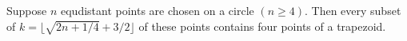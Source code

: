 Suppose $n$ equdistant points are chosen on a circle $(n \geq 4)$. Then every subset of $k = \lfloor \sqrt{2n + 1/4} + 3/2 \rfloor$ of these points contains four points of a trapezoid.
